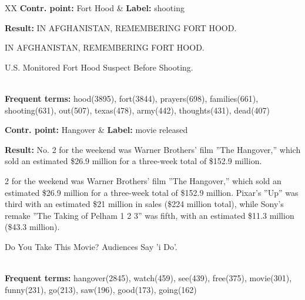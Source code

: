 \begin{table*}[htbp]
\begin{tabularx}{\textwidth}{XX}
\textbf{Contr. point:} Fort Hood & \textbf{Label:} shooting \\
{\textbf{Result:} 
IN AFGHANISTAN, REMEMBERING FORT HOOD.

IN AFGHANISTAN, REMEMBERING FORT HOOD.

U.S. Monitored Fort Hood Suspect Before Shooting.
} \\
{\textbf{Frequent terms:} hood(3895), fort(3844), prayers(698), families(661), shooting(631), out(507), texas(478), army(442), thoughts(431), dead(407)}\\
\hline

\textbf{Contr. point:} Hangover & \textbf{Label:} movie released \\
{\textbf{Result:} 
No. 2 for the weekend was Warner Brothers' film ''The Hangover,'' which sold an
estimated \$26.9 million for a three-week total of \$152.9 million. 

2 for the weekend was Warner Brothers' film ''The Hangover,'' which sold an
estimated \$26.9 million for a three-week total of \$152.9 million. Pixar's
''Up'' was third with an estimated \$21 million in sales (\$224 million total),
while Sony's remake ''The Taking of Pelham 1 2 3'' was fifth, with an estimated
\$11.3 million (\$43.3 million). 

Do You Take This Movie? Audiences Say 'i Do'. 
} \\
{\textbf{Frequent terms:} 
hangover(2845), watch(459), see(439), free(375), movie(301), funny(231), go(213), saw(196), good(173), going(162)}\\
\hline



\end{tabularx}
\end{table*}
